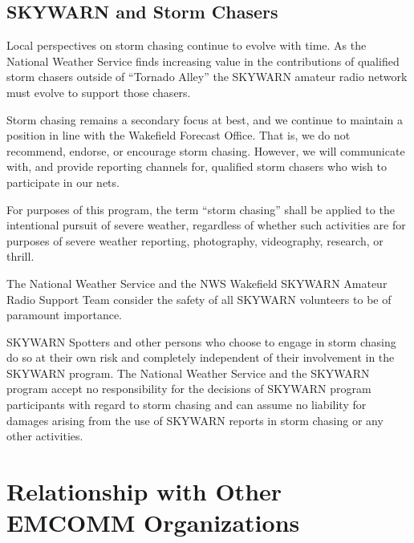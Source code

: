 \documentclass[pdflatex,letterpaper,twoside,12pt]{book}
\begin{document}

\section{SKYWARN and Storm Chasers}

Local perspectives on storm chasing continue to evolve with time.  As the National Weather Service finds increasing value in the contributions of qualified storm chasers outside of ``Tornado Alley'' the SKYWARN amateur radio network must evolve to support those chasers.

Storm chasing remains a secondary focus at best, and we continue to maintain a position in line with the Wakefield Forecast Office.  That is, we do not recommend, endorse, or encourage storm chasing.  However, we will communicate with, and provide reporting channels for, qualified storm chasers who wish to participate in our nets.

For purposes of this program, the term ``storm chasing'' shall be applied to the intentional pursuit of severe weather, regardless of whether such activities are for purposes of severe weather reporting, photography, videography, research, or thrill.

The National Weather Service and the NWS Wakefield SKYWARN Amateur Radio Support Team consider the safety of all SKYWARN volunteers to be of paramount importance.

SKYWARN Spotters and other persons who choose to engage in storm chasing do so at their own risk and completely independent of their involvement in the SKYWARN program.  The National Weather Service and the SKYWARN program accept no responsibility for the decisions of SKYWARN program participants with regard to storm chasing and can assume no liability for damages arising from the use of SKYWARN reports in storm chasing or any other activities.


\chapter{Relationship with Other EMCOMM Organizations}
\end{document}
